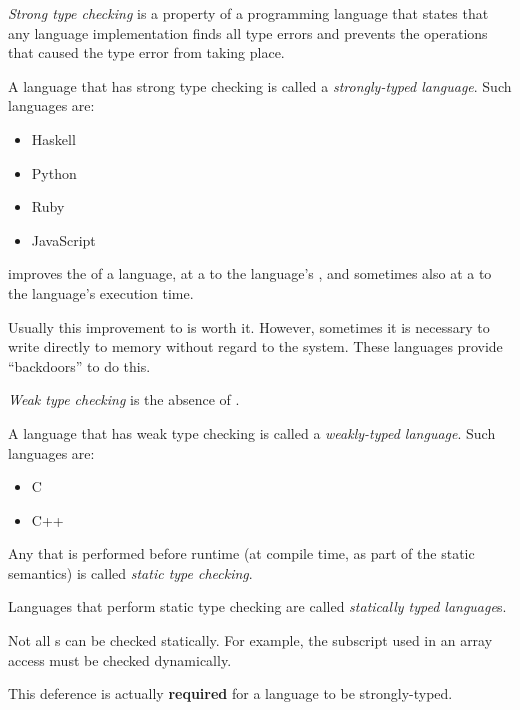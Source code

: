 \begin{definition}\label{def:Strong_Type_Checking}
  \emph{Strong type checking} is a property of a programming language that states that any language implementation finds all type errors and prevents the operations that caused the type error from taking place.

  A language that has strong type checking is called a \emph{strongly-typed language}.
  Such languages are:
  \begin{itemize}[noitemsep]
  \item Haskell
  \item Python
  \item Ruby
  \item JavaScript
  \end{itemize}

  \begin{remark}[Cost]\label{rmk:Strong_Type_Checking_Cost}
     improves the  of a language, at a  to the language's , and sometimes also at a  to the language's execution time.

    Usually this improvement to  is worth it.
    However, sometimes it is necessary to write directly to memory without regard to the  system.
    These languages provide ``backdoors'' to do this.
  \end{remark}
\end{definition}

\begin{definition}\label{def:Weak_Type_Checking}
  \emph{Weak type checking} is the absence of .

  A language that has weak type checking is called a \emph{weakly-typed language}.
  Such languages are:
  \begin{itemize}[noitemsep]
  \item C
  \item C++
  \end{itemize}
\end{definition}

\begin{definition}\label{def:Static_Type_Checking}
  Any  that is performed before runtime (at compile time, as part of the static
  semantics) is called \emph{static type checking}.

  Languages that perform static type checking are called \emph{statically typed language}s.

  \begin{remark}\label{rmk:Static_Type_Checking-Undecidability}
    Not all s can be checked statically.
    For example, the subscript used in an array access must be checked dynamically.

    This deference is actually \textbf{required} for a language to be strongly-typed.
  \end{remark}
\end{definition}

